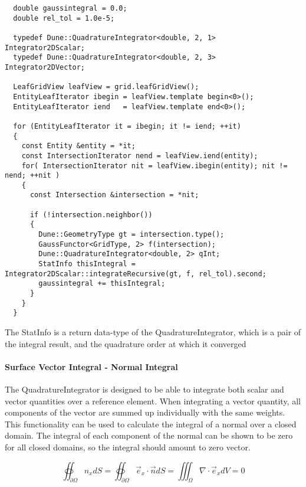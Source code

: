 \begin{mybox}
\begin{lstlisting}
  double gaussintegral = 0.0;
  double rel_tol = 1.0e-5;

  typedef Dune::QuadratureIntegrator<double, 2, 1>  Integrator2DScalar;
  typedef Dune::QuadratureIntegrator<double, 2, 3>  Integrator2DVector;

  LeafGridView leafView = grid.leafGridView();
  EntityLeafIterator ibegin = leafView.template begin<0>();
  EntityLeafIterator iend   = leafView.template end<0>();

  for (EntityLeafIterator it = ibegin; it != iend; ++it)
  {
    const Entity &entity = *it;
    const IntersectionIterator nend = leafView.iend(entity);
    for( IntersectionIterator nit = leafView.ibegin(entity); nit != nend; ++nit )
    {
      const Intersection &intersection = *nit;

      if (!intersection.neighbor())
      {
        Dune::GeometryType gt = intersection.type();
        GaussFunctor<GridType, 2> f(intersection);
        Dune::QuadratureIntegrator<double, 2> qInt;
        StatInfo thisIntegral = Integrator2DScalar::integrateRecursive(gt, f, rel_tol).second;
        gaussintegral += thisIntegral;
      }
    }
  }
\end{lstlisting}
\end{mybox}

\noindent
The StatInfo is a return data-type of the QuadratureIntegrator, which is a pair of the integral result, and the quadrature order at which it converged \\


\paragraph{Surface Vector Integral - Normal Integral}
\noindent
The QuadratureIntegrator is designed to be able to integrate both scalar and vector quantities over a reference element. When integrating a vector quantity, all components of the vector are summed up individually with the same weights. This functionality can be used to calculate the integral of a normal over a closed domain. The integral of each component of the normal can be shown to be zero for all closed domains, so the integral should amount to zero vector.

\begin{equation}
	\oiint_{\partial \Omega} n_x dS = \oiint_{\partial \Omega} \vec{e}_x \cdot \vec{n} dS = \iiint_{\Omega} \nabla \cdot \vec{e}_x dV = 0
\end{equation}

